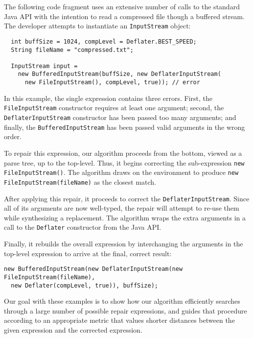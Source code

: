 The following code fragment uses an extensive number of calls to the standard Java API with the intention to read a compressed file though a buffered stream. The developer attempts to instantiate an \lstinline{InputStream} object:
\begin{lstlisting}
  int buffSize = 1024, compLevel = Deflater.BEST_SPEED;
  String fileName = "compressed.txt";
  
  InputStream input = 
    new BufferedInputStream(buffSize, new DeflaterInputStream(
      new FileInputStream(), compLevel, true)); // error 
\end{lstlisting}
In this example, the single expression contains three errors. First, the \lstinline{FileInputStream} constructor requires at least one argument; second, the \lstinline{DeflaterInputStream} constructor has been passed too many arguments; and finally, the \lstinline{BufferedInputStream} has been passed valid arguments in the wrong order.

To repair this expression, our algorithm proceeds from the bottom, viewed as a parse tree, up to the top-level. Thus, it begins correcting the sub-expression \lstinline{new FileInputStream()}. The algorithm draws on the environment to produce \lstinline{new FileInputStream(fileName)} as the closest match.

After applying this repair, it proceeds to correct the \lstinline{DeflaterInputStream}. Since all of its arguments are now well-typed, the repair will attempt to re-use them while synthesizing a replacement. The algorithm wraps the extra arguments in a call to the \lstinline{Deflater} constructor from the Java API.

Finally, it rebuilds the overall expression by interchanging the arguments in the top-level expression to arrive at the final, correct result:
\begin{lstlisting}   
new BufferedInputStream(new DeflaterInputStream(new FileInputStream(fileName),
  new Deflater(compLevel, true)), buffSize);
\end{lstlisting}

Our goal with these examples is to show how our algorithm efficiently searches through a large number of possible repair expressions, and guides that procedure according to an appropriate metric that values shorter distances between the given expression and the corrected expression.
